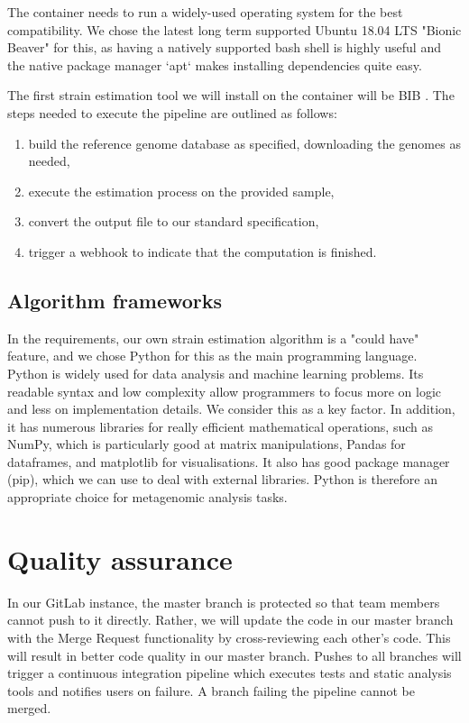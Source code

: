 \documentclass{report}
\begin{document}
The container needs to run a widely-used operating system for the best compatibility. We chose the latest long term supported Ubuntu 18.04 LTS "Bionic Beaver" for this, as having a natively supported bash shell is highly useful and the native package manager `apt` makes installing dependencies quite easy.

The first strain estimation tool we will install on the container will be BIB \cite{mbs:/content/journal/mgen/10.1099/mgen.0.000075}. The steps needed to execute the pipeline are outlined as follows:
\begin{enumerate}
    \item build the reference genome database as specified, downloading the genomes as needed,
    \item execute the estimation process on the provided sample,
    \item convert the output file to our standard specification,
    \item trigger a webhook to indicate that the computation is finished.
\end{enumerate}


\subsection{Algorithm frameworks}
In the requirements, our own strain estimation algorithm is a "could have" feature, and we chose Python for this as the main programming language. Python is widely used for data analysis \cite{python_data_analysis} and machine learning problems. Its readable syntax and low complexity allow programmers to focus more on logic and less on implementation details. We consider this as a key factor. In addition, it has numerous libraries for really efficient mathematical operations, such as NumPy, which is particularly good at matrix manipulations, Pandas for dataframes, and matplotlib for visualisations. It also has good package manager (pip), which we can use to deal with external libraries. Python is therefore an appropriate choice for metagenomic analysis tasks.


\section{Quality assurance}
In our GitLab instance, the master branch is protected so that team members cannot push to it directly. Rather, we will update the code in our master branch with the Merge Request functionality by cross-reviewing each other's code. This will result in better code quality in our master branch. Pushes to all branches will trigger a continuous integration pipeline which executes tests and static analysis tools and notifies users on failure. A branch failing the pipeline cannot be merged.
\end{document}
